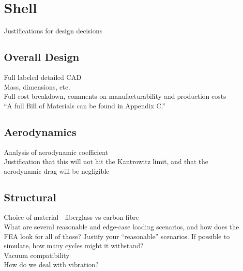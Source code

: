 \documentclass[main.tex]{subfiles}
\begin{document}
    \section{Shell}
    Justifications for design decisions
    \subsection{Overall Design}
    Full labeled detailed CAD\\
    Mass, dimensions, etc.\\
    Full cost breakdown, comments on manufacturability and production costs\\
    “A full Bill of Materials can be found in Appendix C.”

    \subsection{Aerodynamics}
    Analysis of aerodynamic coefficient\\
    Justification that this will not hit the Kantrowitz limit, and that the aerodynamic drag will be negligible

    \subsection{Structural}
    Choice of material - fiberglass vs carbon fibre\\
    What are several reasonable and edge-case loading scenarios, and how does the FEA look for all of those? Justify your “reasonable” scenarios. If possible to simulate, how many cycles might it withstand?\\
    Vacuum compatibility\\
    How do we deal with vibration?
\end{document}
